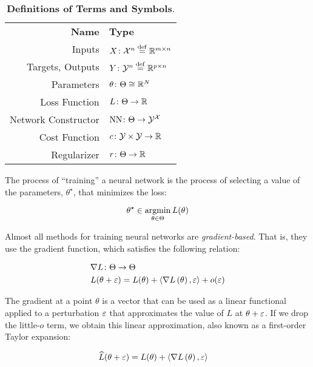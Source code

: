 \documentclass[../../thesis.tex]{subfiles}
\begin{document}
\begin{table}[h]
	\begin{center}
		\begin{tabular}{rl}
			\textbf{Name}       & \textbf{Type}                          \\
			Inputs              & $X \colon {\mathcal{X}}^n \stackrel{\small \mathrm{def}}{=} \mathbb{R}^{m\times n}$  \\
			Targets, Outputs    & $Y \colon {\mathcal{Y}}^n \stackrel{\small \mathrm{def}}{=} \mathbb{R}^{p\times n}$  \\
			Parameters          & $\theta \colon \Theta \cong \mathbb{R}^N$        \\
			Loss Function       & $L \colon \Theta \to \mathbb{R}$                \\
			Network Constructor & $\mathrm{NN} \colon \Theta \to {\mathcal{Y}}^{\mathcal{X}}$ \\
			Cost Function       & $c \colon {\mathcal{Y}} \times {\mathcal{Y}} \to \mathbb{R}$        \\
			Regularizer         & $r \colon \Theta \to \mathbb{R}$
		\end{tabular}
	\end{center}
	\caption{\textbf{Definitions of Terms and Symbols}.}
\end{table}

The process of \enquote{training} a neural network is the process
of selecting a value of the parameters, $\theta^\star$, that minimizes the loss:

\begin{equation}\equationlabel{minimize}
	\theta^\star \in \argmin_{\theta \in \Theta} L(\theta)
\end{equation}

Almost all methods for training neural networks
are \emph{gradient-based}.
That is, they use the gradient function,
which satisfies the following relation:

\begin{align}
	&\nabla{L}\from \Theta \to \Theta\\
	&L(\theta + \eps) = L(\theta) + \langle\grad{L}{\theta},\eps\rangle + o(\eps)\equationlabel{grad-def}
\end{align}

The gradient at a point $\theta$ is a vector that can be used
as a linear functional applied to a perturbation $\varepsilon$ that approximates
the value of $L$ at $\theta + \varepsilon$.
If we drop the little-$o$ term,
we obtain this linear approximation,
also known as a first-order Taylor expansion:

\begin{align}
	&\widehat{L}(\theta + \varepsilon) = L(\theta) + \langle\nabla L\left(\theta\right),\varepsilon\rangle
\end{align}
\end{document}
